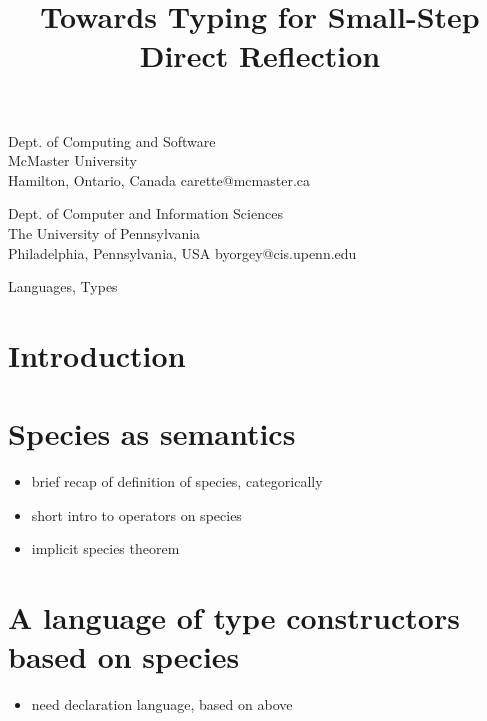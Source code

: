 \documentclass[9pt]{sigplanconf}
\begin{document}
\title{Towards Typing for Small-Step Direct Reflection}

{Dept. of Computing and Software\\ McMaster University\\
Hamilton, Ontario, Canada}
{carette@mcmaster.ca}

{Dept. of Computer and Information Sciences\\ The University of Pennsylvania\\
Philadelphia, Pennsylvania, USA}
{byorgey@cis.upenn.edu}

\maketitle

\begin{abstract}
\end{abstract}


\terms
Languages, Types

\section{Introduction}\label{sec:intro}

\section{Species as semantics}\label{sec:specsem}
\begin{itemize}
\item brief recap of definition of species, categorically
\item short intro to operators on species
\item implicit species theorem
\end{itemize}

\section{A language of type constructors based on species}\label{sec:language}
\begin{itemize}
\item need declaration language, based on above
\end{itemize}
\end{document}
